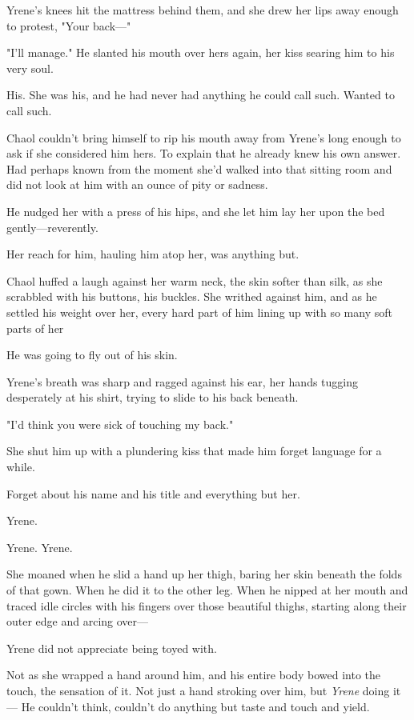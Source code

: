 Yrene's knees hit the mattress behind them, and she drew her lips away enough to protest, "Your back---"

"I'll manage."
He slanted his mouth over hers again, her kiss searing him to his very soul.

His.
She was his, and he had never had anything he could call such.
Wanted to call such.

Chaol couldn't bring himself to rip his mouth away from Yrene's long enough to ask if she considered him hers.
To explain that he already knew his own answer.
Had perhaps known from the moment she'd walked into that sitting room and did not look at him with an ounce of pity or sadness.

He nudged her with a press of his hips, and she let him lay her upon the bed gently---reverently.

Her reach for him, hauling him atop her, was anything but.

Chaol huffed a laugh against her warm neck, the skin softer than silk, as she scrabbled with his buttons, his buckles.
She writhed against him, and as he settled his weight over her, every hard part of him lining up with so many soft parts of her 

He was going to fly out of his skin.

Yrene's breath was sharp and ragged against his ear, her hands tugging desperately at his shirt, trying to slide to his back beneath.

"I'd think you were sick of touching my back."

She shut him up with a plundering kiss that made him forget language for a while.

Forget about his name and his title and everything but her.

Yrene.

Yrene.
Yrene.

She moaned when he slid a hand up her thigh, baring her skin beneath the folds of that gown.
When he did it to the other leg.
When he nipped at her mouth and traced idle circles with his fingers over those beautiful thighs, starting along their outer edge and arcing over---

Yrene did not appreciate being toyed with.

Not as she wrapped a hand around him, and his entire body bowed into the touch, the sensation of it.
Not just a hand stroking over him, but \emph{Yrene} doing it--- He couldn't think, couldn't do anything but taste and touch and yield.

